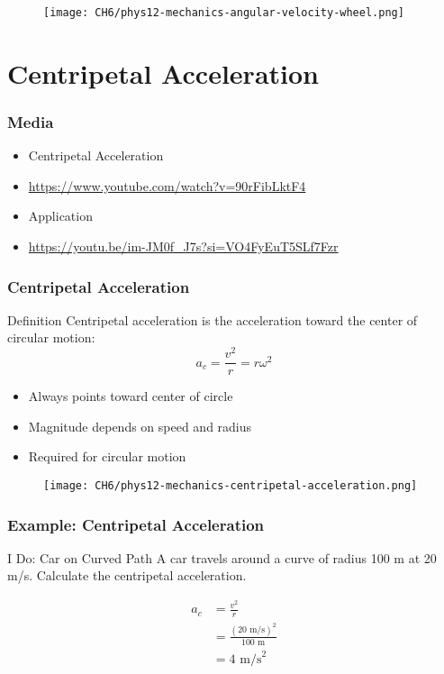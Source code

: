 \documentclass{beamer}
\begin{document}
\begin{frame}
\begin{figure}
    \centering
    \texttt{[image: CH6/phys12-mechanics-angular-velocity-wheel.png]}
\end{figure}
\end{frame}

\section{Centripetal Acceleration}

\begin{frame}
\frametitle{Media}
     \begin{itemize}
  \item Centripetal Acceleration
  \item \hyperlink{https://www.youtube.com/watch?v=90rFibLktF4}{https://www.youtube.com/watch?v=90rFibLktF4}
  \item Application
  \item \hyperlink{https://youtu.be/im-JM0f_J7s?si=VO4FyEuT5SLf7Fzr}{https://youtu.be/im-JM0f_J7s?si=VO4FyEuT5SLf7Fzr}
  \end{itemize}
\end{frame}

\begin{frame}
\frametitle{Centripetal Acceleration}
\begin{block}{Definition}
Centripetal acceleration is the acceleration toward the center of circular motion:
\[ a_c = \frac{v^2}{r} = r\omega^2 \]
\end{block}
\begin{itemize}
\item Always points toward center of circle
\item Magnitude depends on speed and radius
\item Required for circular motion
\end{itemize}
\end{frame}

\begin{frame}
\begin{figure}
    \centering
    \texttt{[image: CH6/phys12-mechanics-centripetal-acceleration.png]}
\end{figure}
\end{frame}

\begin{frame}
\frametitle{Example: Centripetal Acceleration}
\begin{block}{I Do: Car on Curved Path}
A car travels around a curve of radius 100 m at 20 m/s.
Calculate the centripetal acceleration.
\end{block}
\begin{align*}
a_c &= \frac{v^2}{r} \\
&= \frac{(20\text{ m/s})^2}{100\text{ m}} \\
&= 4\text{ m/s}^2
\end{align*}
\end{frame}
\end{document}
